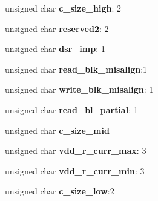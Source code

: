 \begin{DoxyCompactItemize}
\item 
\hypertarget{struct_c_s_d_v1_a8ca62fc4ed0f6598005209d3c34f9c44}{unsigned char {\bfseries c\-\_\-size\-\_\-high}\-: 2}\label{struct_c_s_d_v1_a8ca62fc4ed0f6598005209d3c34f9c44}

\item 
\hypertarget{struct_c_s_d_v1_add22350e7fe29ca6649dd6564e8425ea}{unsigned char {\bfseries reserved2}\-: 2}\label{struct_c_s_d_v1_add22350e7fe29ca6649dd6564e8425ea}

\item 
\hypertarget{struct_c_s_d_v1_adca766448ce5830490363d3fbb02ab4b}{unsigned char {\bfseries dsr\-\_\-imp}\-: 1}\label{struct_c_s_d_v1_adca766448ce5830490363d3fbb02ab4b}

\item 
\hypertarget{struct_c_s_d_v1_a31c0f3174289d3fb8abade294770fc33}{unsigned char {\bfseries read\-\_\-blk\-\_\-misalign}\-:1}\label{struct_c_s_d_v1_a31c0f3174289d3fb8abade294770fc33}

\item 
\hypertarget{struct_c_s_d_v1_a5fd0cab21c874fd49fc4ea5d537be201}{unsigned char {\bfseries write\-\_\-blk\-\_\-misalign}\-: 1}\label{struct_c_s_d_v1_a5fd0cab21c874fd49fc4ea5d537be201}

\item 
\hypertarget{struct_c_s_d_v1_a7387a4ab3ec1161c246ed02941e1325e}{unsigned char {\bfseries read\-\_\-bl\-\_\-partial}\-: 1}\label{struct_c_s_d_v1_a7387a4ab3ec1161c246ed02941e1325e}

\item 
\hypertarget{struct_c_s_d_v1_a8cd3e8cdbf34be110b1d87b0c5f7b1d8}{unsigned char {\bfseries c\-\_\-size\-\_\-mid}}\label{struct_c_s_d_v1_a8cd3e8cdbf34be110b1d87b0c5f7b1d8}

\item 
\hypertarget{struct_c_s_d_v1_a68aafd29ea70955c274ebeb0364b4033}{unsigned char {\bfseries vdd\-\_\-r\-\_\-curr\-\_\-max}\-: 3}\label{struct_c_s_d_v1_a68aafd29ea70955c274ebeb0364b4033}

\item 
\hypertarget{struct_c_s_d_v1_a0e5dbcfa1434c0d43a5f71067b54377a}{unsigned char {\bfseries vdd\-\_\-r\-\_\-curr\-\_\-min}\-: 3}\label{struct_c_s_d_v1_a0e5dbcfa1434c0d43a5f71067b54377a}

\item 
\hypertarget{struct_c_s_d_v1_a2af914ea8fe2b045432553e2d7c75bb7}{unsigned char {\bfseries c\-\_\-size\-\_\-low}\-:2}\label{struct_c_s_d_v1_a2af914ea8fe2b045432553e2d7c75bb7}


\end{DoxyCompactItemize}
